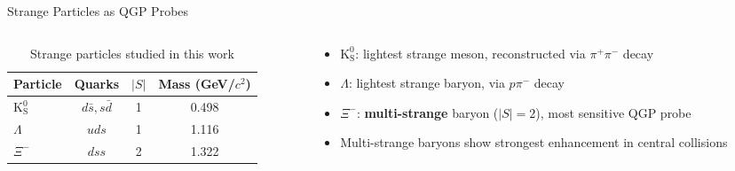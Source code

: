 \documentclass[10pt, aspectratio=169]{beamer}
\begin{document}
\begin{frame}{Strange Particles as QGP Probes}

  \begin{columns}
    \begin{column}{0.50\textwidth}
      \begin{table}
        \centering
        \renewcommand{\arraystretch}{1.5}
        \begin{tabular}{lccc}
          \toprule
          \textbf{Particle} & \textbf{Quarks} & $|S|$ & \textbf{Mass (GeV/$c^2$)} \\
          \midrule
          $\mathrm{K^0_S}$  & $d\bar{s}, s\bar{d}$ & 1 & 0.498 \\
          $\Lambda$          & $uds$                & 1 & 1.116 \\
          $\Xi^-$            & $dss$                & 2 & 1.322 \\
          \bottomrule
        \end{tabular}
        \caption{Strange particles studied in this work}
      \end{table}
    \end{column}
    \begin{column}{0.47\textwidth}
      \begin{itemize}
        \item $\mathrm{K^0_S}$: lightest strange meson, reconstructed via $\pi^+\pi^-$ decay
        \item $\Lambda$: lightest strange baryon, via $p\pi^-$ decay
        \item $\Xi^-$: \textbf{multi-strange} baryon ($|S|=2$), most sensitive QGP probe
        \item Multi-strange baryons show \alert{strongest enhancement} in central collisions
      \end{itemize}
    \end{column}
  \end{columns}

\end{frame}
\end{document}
